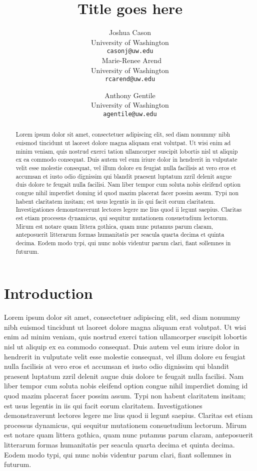 \documentclass[11pt]{article}
\title{Title goes here}
\author{Joshua Cason \\
  University of Washington \\
  {\tt casonj@uw.edu} \\\,
  Marie-Renee Arend\\
  University of Washington \\
  {\tt rcarend@uw.edu} \\\and
  Anthony Gentile \\
  University of Washington \\
  {\tt agentile@uw.edu} \\}
\date{}
\begin{document}
\maketitle
\begin{abstract}
  Lorem ipsum dolor sit amet, consectetuer adipiscing elit, sed diam nonummy nibh euismod tincidunt ut laoreet dolore magna aliquam erat volutpat. 
  Ut wisi enim ad minim veniam, quis nostrud exerci tation ullamcorper suscipit lobortis nisl ut aliquip ex ea commodo consequat. Duis autem vel eum 
  iriure dolor in hendrerit in vulputate velit esse molestie consequat, vel illum dolore eu feugiat nulla facilisis at vero eros et accumsan et 
  iusto odio dignissim qui blandit praesent luptatum zzril delenit augue duis dolore te feugait nulla facilisi. Nam liber tempor cum soluta nobis 
  eleifend option congue nihil imperdiet doming id quod mazim placerat facer possim assum. Typi non habent claritatem insitam; est usus legentis in 
  iis qui facit eorum claritatem. Investigationes demonstraverunt lectores legere me lius quod ii legunt saepius. Claritas est etiam processus dynamicus, 
  qui sequitur mutationem consuetudium lectorum. Mirum est notare quam littera gothica, quam nunc putamus parum claram, anteposuerit litterarum formas 
  humanitatis per seacula quarta decima et quinta decima. Eodem modo typi, qui nunc nobis videntur parum clari, fiant sollemnes in futurum.
\end{abstract}

\section{Introduction}

  Lorem ipsum dolor sit amet, consectetuer adipiscing elit, sed diam nonummy nibh euismod tincidunt ut laoreet dolore magna aliquam erat volutpat. 
  Ut wisi enim ad minim veniam, quis nostrud exerci tation ullamcorper suscipit lobortis nisl ut aliquip ex ea commodo consequat. Duis autem vel eum 
  iriure dolor in hendrerit in vulputate velit esse molestie consequat, vel illum dolore eu feugiat nulla facilisis at vero eros et accumsan et 
  iusto odio dignissim qui blandit praesent luptatum zzril delenit augue duis dolore te feugait nulla facilisi. Nam liber tempor cum soluta nobis 
  eleifend option congue nihil imperdiet doming id quod mazim placerat facer possim assum. Typi non habent claritatem insitam; est usus legentis in 
  iis qui facit eorum claritatem. Investigationes demonstraverunt lectores legere me lius quod ii legunt saepius. Claritas est etiam processus dynamicus, 
  qui sequitur mutationem consuetudium lectorum. Mirum est notare quam littera gothica, quam nunc putamus parum claram, anteposuerit litterarum formas 
  humanitatis per seacula quarta decima et quinta decima. Eodem modo typi, qui nunc nobis videntur parum clari, fiant sollemnes in futurum.
\end{document}
